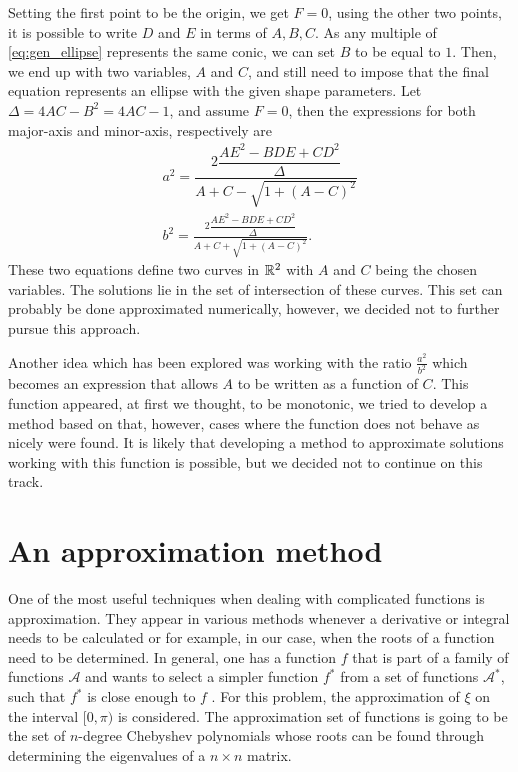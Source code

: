 Setting the first point to be the origin, we get $F=0$, using the other two points, it is possible to write $D$ and $E$ in terms of $A, B, C$. As any multiple of \autoref{eq:gen_ellipse} represents the same conic, we can set $B$ to be equal to $1$. Then, we end up with two variables, $A$ and $C$, and still need to impose that the final equation represents an ellipse with the given shape parameters. Let $\Delta=4AC-B^2=4AC-1$, and assume $F=0$, then the expressions for both major-axis and minor-axis, respectively are
\begin{align}\label{eq:gen_ellipse_a}
a^2 = \dfrac{2\dfrac{AE^2 -BDE +CD^2}{\Delta}}{A + C - \sqrt{1 + (A-C)^2}}\\
\label{eq:gen_ellipse_b}b^2 = \frac{2\dfrac{AE^2 -BDE +CD^2}{\Delta}}{A + C + \sqrt{1 + (A-C)^2}}.
\end{align}
These two equations define two curves in $\mathbb{R}^2$ with $A$ and $C$ being the chosen variables. The solutions lie in the set of intersection of these curves. This set can probably be done approximated numerically, however, we decided not to further pursue this approach.

Another idea which has been explored was working with the ratio $\frac{a^2}{b^2}$ which becomes an expression that allows $A$ to be written as a function of $C$. This function appeared, at first we thought, to be monotonic, we tried to develop a method based on that, however, cases where the function does not behave as nicely were found. It is likely that developing a method to approximate solutions working with this function is possible, but we decided not to continue on this track.


\section{An approximation method}

One of the most useful techniques when dealing with complicated functions is approximation. They appear in various methods whenever a derivative or integral needs to be calculated or for example, in our case, when the roots of a function need to be determined. In general, one has a function $f$ that is part of a family of functions $\mathcal{A}$ and wants to select a simpler function $f^*$ from a set of functions $\mathcal{A^*}$, such that $f^*$ is close enough to $f$ \cite[p.~3]{powell}. For this problem, the approximation of $\xi$ on the interval $[0, \pi)$ is considered. The approximation set of functions is going to be the set of $n$-degree Chebyshev polynomials whose roots can be found through determining the eigenvalues of a $n\times n$ matrix.



